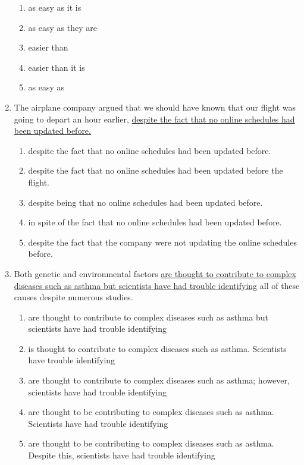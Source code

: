 \begin{enumerate}
\bigskip
\begin{enumerate}[label=(\Alph*)]
\item as easy as it is
\item as easy as they are
\item easier than 
\item easier than it is
\item as easy as
\end{enumerate}


\item The airplane company argued that we should have known that our flight was going to depart an hour earlier, \ul{despite the fact that no online schedules had been updated before.}

\bigskip
\begin{enumerate}[label=(\Alph*)]
\item despite the fact that no online schedules had been updated before.
\item despite the fact that no online schedules had been updated before the flight. 
\item despite being that no online schedules had been updated before.
\item in spite of the fact that no online schedules had been updated before.
\item despite the fact that the company were not updating the online schedules before. 
\end{enumerate}

\item Both genetic and environmental factors \ul{are thought to contribute to complex diseases such as asthma but scientists have had trouble identifying} all of these causes despite numerous studies. 

\bigskip
\begin{enumerate}[label=(\Alph*)]
\item are thought to contribute to complex diseases such as asthma but scientists have had trouble identifying
\item is thought to contribute to complex diseases such as asthma. Scientists have trouble identifying    
\item are thought to contribute to complex diseases such as asthma; however, scientists have had trouble identifying
\item are thought to be contributing to complex diseases such as asthma. Scientists have had trouble identifying
\item are thought to be contributing to complex diseases such as asthma. Despite this, scientists have had trouble identifying
\end{enumerate}



\end{enumerate}
